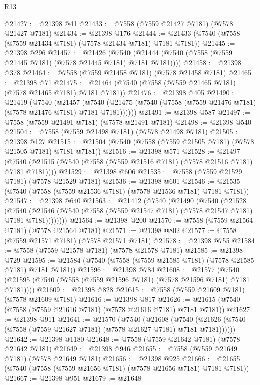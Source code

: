 \begin{lexlean}{R13}
\begin{coremodule}
@21427 := @21398 @41
@21433 := @7558 (@7559 @21427 @7181) (@7578 @21427 @7181)
@21434 := @21398 @176
@21444 := @21433 (@7540 (@7558 (@7559 @21434 @7181) (@7578 @21434 @7181) @7181 @7181))
@21445 := @21398 @296
@21457 := @21426
    (@7540 (@21444 (@7540 (@7558 (@7559 @21445 @7181) (@7578 @21445 @7181) @7181 @7181))))
@21458 := @21398 @378
@21464 := @7558 (@7559 @21458 @7181) (@7578 @21458 @7181)
@21465 := @21398 @71
@21475 := @21464 (@7540 (@7558 (@7559 @21465 @7181) (@7578 @21465 @7181) @7181 @7181))
@21476 := @21398 @405
@21490 := @21419
    (@7540
      (@21457
        (@7540 (@21475 (@7540 (@7558 (@7559 @21476 @7181) (@7578 @21476 @7181) @7181 @7181))))))
@21491 := @21398 @587
@21497 := @7558 (@7559 @21491 @7181) (@7578 @21491 @7181)
@21498 := @21398 @540
@21504 := @7558 (@7559 @21498 @7181) (@7578 @21498 @7181)
@21505 := @21398 @127
@21515 := @21504 (@7540 (@7558 (@7559 @21505 @7181) (@7578 @21505 @7181) @7181 @7181))
@21516 := @21398 @571
@21528 := @21497
    (@7540 (@21515 (@7540 (@7558 (@7559 @21516 @7181) (@7578 @21516 @7181) @7181 @7181))))
@21529 := @21398 @606
@21535 := @7558 (@7559 @21529 @7181) (@7578 @21529 @7181)
@21536 := @21398 @601
@21546 := @21535 (@7540 (@7558 (@7559 @21536 @7181) (@7578 @21536 @7181) @7181 @7181))
@21547 := @21398 @640
@21563 := @21412
    (@7540
      (@21490
        (@7540
          (@21528
            (@7540
              (@21546 (@7540 (@7558 (@7559 @21547 @7181) (@7578 @21547 @7181) @7181 @7181))))))))
@21564 := @21398 @200
@21570 := @7558 (@7559 @21564 @7181) (@7578 @21564 @7181)
@21571 := @21398 @802
@21577 := @7558 (@7559 @21571 @7181) (@7578 @21571 @7181)
@21578 := @21398 @755
@21584 := @7558 (@7559 @21578 @7181) (@7578 @21578 @7181)
@21585 := @21398 @729
@21595 := @21584 (@7540 (@7558 (@7559 @21585 @7181) (@7578 @21585 @7181) @7181 @7181))
@21596 := @21398 @784
@21608 := @21577
    (@7540 (@21595 (@7540 (@7558 (@7559 @21596 @7181) (@7578 @21596 @7181) @7181 @7181))))
@21609 := @21398 @828
@21615 := @7558 (@7559 @21609 @7181) (@7578 @21609 @7181)
@21616 := @21398 @817
@21626 := @21615 (@7540 (@7558 (@7559 @21616 @7181) (@7578 @21616 @7181) @7181 @7181))
@21627 := @21398 @911
@21641 := @21570
    (@7540
      (@21608
        (@7540 (@21626 (@7540 (@7558 (@7559 @21627 @7181) (@7578 @21627 @7181) @7181 @7181))))))
@21642 := @21398 @1180
@21648 := @7558 (@7559 @21642 @7181) (@7578 @21642 @7181)
@21649 := @21398 @946
@21655 := @7558 (@7559 @21649 @7181) (@7578 @21649 @7181)
@21656 := @21398 @925
@21666 := @21655 (@7540 (@7558 (@7559 @21656 @7181) (@7578 @21656 @7181) @7181 @7181))
@21667 := @21398 @951
@21679 := @21648

\end{coremodule}
\end{lexlean}
